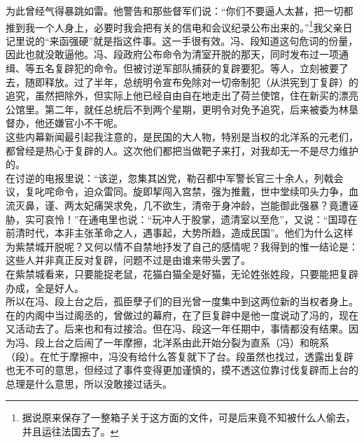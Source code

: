 为此曾经气得暴跳如雷。他警告和那些督军们说：“你们不要逼人太甚，把一切都推到我一个人身上，必要时我会把有关的信电和会议纪录公布出来的。”\footnote{据说原来保存了一整箱子关于这方面的文件，可是后来竟不知被什么人偷去，并且运往法国去了。}我父亲日记里说的“来函强硬”就是指这件事。这一手很有效。冯、段知道这句危词的份量，因此也就没敢逼他。冯、段政府公布命令为清室开脱的那天，同时发布过一项通缉、等五名复辟犯的命令。但被讨逆军部队捕获的复辟要犯。等人，立刻被要了去，随即释放。过了半年，总统明令宣布免除对一切帝制犯（从洪宪到丁复辟）的追究，虽然把除外，但实际上他已经自由自在地走出了荷兰使馆，住在新买的漂亮公馆里。第二年，就任总统后不到两个星期，更明令对免予追究，后来被委为林垦督办，他还嫌官小不干呢。\\

这些内幕新闻最引起我注意的，是民国的大人物，特别是当权的北洋系的元老们，都曾经是热心于复辟的人。这次他们都把当做靶子来打，对我却无一不是尽力维护的。\\

在讨逆的电报里说：“该逆，忽集其凶党，勒召都中军警长官三十余人，列戟会议，复叱咤命令，迫众雷同。旋即挈闯入宫禁，强为推戴，世中堂续叩头力争，血流灭鼻，谨、两太妃痛哭求免，几不欲生，清帝于身冲龄，岂能御此强暴？竟遭诬胁，实可哀怜！”在通电里也说：“玩冲人于股掌，遗清室以至危”，又说：“国璋在前清时代，本非主张革命之人，遇事起，大势所趋，造成民国”。他们为什么这样为紫禁城开脱呢？又何以情不自禁地抒发了自己的感情呢？我得到的惟一结论是：这些人并非真正反对复辟，问题不过是由谁来带头罢了。\\

在紫禁城看来，只要能捉老鼠，花猫白猫全是好猫，无论姓张姓段，只要能把复辟办成，全是好人。\\

所以在冯、段上台之后，孤臣孽子们的目光曾一度集中到这两位新的当权者身上。在的内阁中当过阁丞的，曾做过的幕府，在了巨复辟中是他一度说动了冯的，现在又活动去了。后来也和有过接洽。但在冯、段这一年任期中，事情都没有结果。因为冯、段上台之后闹了一年摩擦，北洋系由此开始分裂为直系（冯）和皖系（段）。在忙于摩擦中，冯没有给什么答复就下了台。段虽然也找过，透露出复辟也无不可的意思，但经过了事件变得更加谨慎的，摸不透这位靠讨伐复辟而上台的总理是什么意思，所以没敢接过话头。\\

